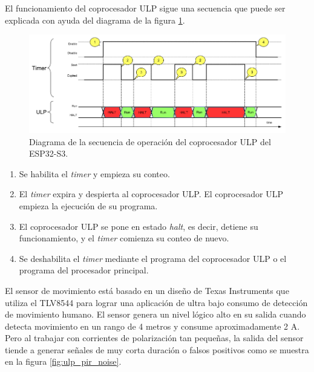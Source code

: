 El funcionamiento del coprocesador ULP sigue una secuencia que puede ser explicada con ayuda del diagrama de la figura \ref{fig:ulp_sequence}.

\begin{figure}[h]
	\centering
	\includegraphics[scale=0.43]{./Figures/ulp_sequence.png}
	\caption{Diagrama de la secuencia de operación del coprocesador ULP del ESP32-S3\protect\footnotemark.}
	\label{fig:ulp_sequence}
\end{figure}

\begin{enumerate}
	\item Se habilita el \textit{timer} y empieza su conteo.
	\item El \textit{timer} expira y despierta al coprocesador ULP. El coprocesador ULP empieza la ejecución de su programa. 
	\item El coprocesador ULP se pone en estado \textit{halt}, es decir, detiene su funcionamiento, y el \textit{timer} comienza su conteo de nuevo.
	\item Se deshabilita el \textit{timer} mediante el programa del coprocesador ULP o el programa del procesador principal.
\end{enumerate}

El sensor de movimiento está basado en un diseño de Texas Instruments \cite{pir_ti} que utiliza el TLV8544 para lograr una aplicación de ultra bajo consumo de detección de movimiento humano. El sensor genera un nivel lógico alto en su salida cuando detecta movimiento en un rango de 4 metros y consume aproximadamente 2 \textmu A. Pero al trabajar con corrientes de polarización tan pequeñas, la salida del sensor tiende a generar señales de muy corta duración o falsos positivos como se muestra en la figura \ref{fig:ulp_pir_noise}.

